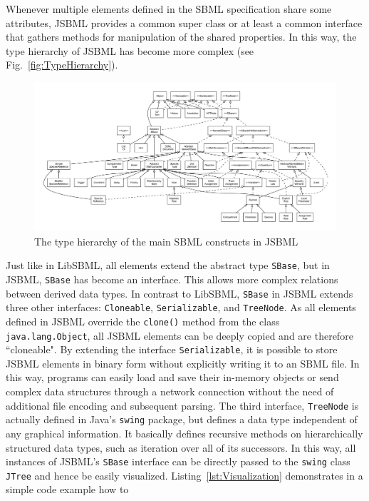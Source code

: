 \documentclass[
  BCOR12mm,
  letterpaper,
  11pt,
  headsepline,
  pointlessnumbers,
  tablecaptionabove,
  headinclude,
  appendixprefix,
  idxtotoc,
  bibtotoc,
  twoside,
  titlepage
]{scrartcl}
\begin{document}
Whenever multiple elements defined in the SBML specification share some
attributes, JSBML provides a common super class or at least a common interface
that gathers methods for manipulation of the shared properties. In this way, the
type hierarchy of JSBML has become more complex (see
Fig.~\vref{fig:TypeHierarchy}).
\begin{figure}
\centering
\includegraphics[width=\textwidth]{FullTypeHierarchy.pdf}
\caption[The type hierarchy in JSBML]{The type hierarchy of the main SBML
constructs in JSBML}
\label{fig:TypeHierarchy}
\end{figure}
Just like in LibSBML, all elements extend the abstract type \verb!SBase!, but in
JSBML, \verb!SBase! has become an interface. This allows more complex relations
between derived data types. In contrast to LibSBML, \verb!SBase! in JSBML
extends three other interfaces: \verb!Cloneable!, \verb!Serializable!, and
\verb!TreeNode!. As all elements defined in JSBML override the \verb!clone()!
method from the class \verb!java.lang.Object!, all JSBML elements can be deeply
copied and are therefore ``cloneable". By extending the interface
\verb!Serializable!, it is possible to store JSBML elements in binary form
without explicitly writing it to an SBML file. In this way, programs can easily
load and save their in-memory objects or send complex data structures
through a network connection without the need of additional file encoding and
subsequent parsing. The third interface, \verb!TreeNode! is actually defined in
Java's \verb!swing! package, but defines a data type independent of any
graphical information. It basically defines recursive methods on hierarchically
structured data types, such as iteration over all of its successors. In this
way, all instances of JSBML's \verb!SBase! interface can be directly passed to
the \verb!swing! class \verb!JTree! and hence be easily visualized.
Listing~\vref{lst:Visualization} demonstrates in a simple code example how to
\end{document}
